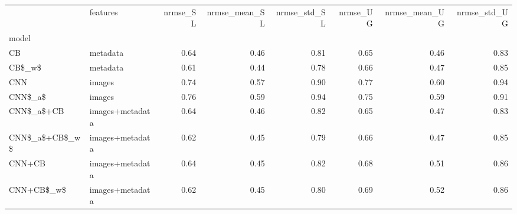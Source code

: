 \begin{tabular}{llrrrrrr}
\toprule
{} &         features &  nrmse\_SL &  nrmse\_mean\_SL &  nrmse\_std\_SL &  nrmse\_UG &  nrmse\_mean\_UG &  nrmse\_std\_UG \\
model          &                  &           &                &               &           &                &               \\
\midrule
CB             &         metadata &      0.64 &           0.46 &          0.81 &      0.65 &           0.46 &          0.83 \\
CB\$\_w\$         &         metadata &      0.61 &           0.44 &          0.78 &      0.66 &           0.47 &          0.85 \\
CNN            &           images &      0.74 &           0.57 &          0.90 &      0.77 &           0.60 &          0.94 \\
CNN\$\_a\$        &           images &      0.76 &           0.59 &          0.94 &      0.75 &           0.59 &          0.91 \\
CNN\$\_a\$+CB     &  images+metadata &      0.64 &           0.46 &          0.82 &      0.65 &           0.47 &          0.83 \\
CNN\$\_a\$+CB\$\_w\$ &  images+metadata &      0.62 &           0.45 &          0.79 &      0.66 &           0.47 &          0.85 \\
CNN+CB         &  images+metadata &      0.64 &           0.45 &          0.82 &      0.68 &           0.51 &          0.86 \\
CNN+CB\$\_w\$     &  images+metadata &      0.62 &           0.45 &          0.80 &      0.69 &           0.52 &          0.86 \\
\bottomrule
\end{tabular}
